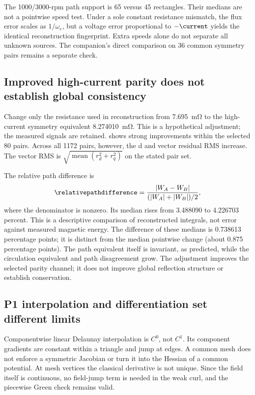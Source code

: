 The 1000/3000-rpm path support is 65 versus 45 rectangles. Their medians
are not a pointwise speed test. Under a sole constant resistance mismatch,
the flux error scales as $1/\omega_e$, but a voltage error proportional to
$-\current$ yields the identical reconstruction fingerprint. Extra speeds
alone do not separate all unknown sources. The companion's direct comparison
on 36 common symmetry pairs remains a separate check.

\subsection{Improved high-current parity does not establish global consistency}
Change only the resistance used in reconstruction from
\SI{7.695}{\milli\ohm} to the high-current symmetry equivalent
\SI{8.274010}{\milli\ohm}. This is a hypothetical adjustment; the measured
signals are retained.  shows strong improvements
within the selected 80 pairs. Across all 1172 pairs, however, the d and
vector residual RMS increase. The vector RMS is
$\sqrt{\operatorname{mean}(r_d^2+r_q^2)}$ on the stated pair set.
\begin{table}[tb]
\centering\small

\caption{2000 rpm/60 $^\circ$C: raw reconstruction versus a symmetry-based
resistance hypothesis on unchanged support. High and all-pair parity are
separate metrics; the last three rows concern flux path integrals. No
experimentally identified correction is implied.}
\label{tab:audit-adjustment}
\end{table}
The relative path difference is
\begin{equation}
 \relativepathdifference=
 \frac{|W_A-W_B|}{(|W_A|+|W_B|)/2},\label{eq:relative-real-path}
\end{equation}
where the denominator is nonzero. Its median rises from 3.488090 to
4.226703 percent. This is a descriptive comparison of reconstructed
integrals, not error against measured magnetic energy. The difference of
these medians is 0.738613 percentage points; it is distinct from the median
pointwise change (about 0.875 percentage points). The path equivalent itself
is invariant, as predicted, while the circulation equivalent and path
disagreement grow. The adjustment improves the selected parity channel;
it does not improve global reflection structure or establish conservation.

\subsection{P1 interpolation and differentiation set different limits}
Componentwise linear Delaunay interpolation is $C^0$, not $C^1$.
Its component gradients are constant within a triangle and jump at edges.
A common mesh does not enforce a symmetric Jacobian or turn it into the
Hessian of a common potential. At mesh vertices the classical derivative
is not unique. Since the field itself is continuous, no field-jump term
is needed in the weak curl, and the piecewise Green check remains valid.


